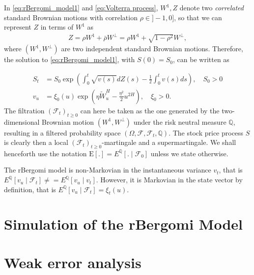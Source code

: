\documentclass[11pt]{article}
\newcommand{\expt}[1]{\mathrm{E}\left[#1\right]}
\newcommand{\PERIOD}{.}
\begin{document}
In \eqref{eq:rBergomi_model1} and \eqref{eq:Volterra process}, $W^1, Z$ denote two \emph{correlated} standard Brownian motions with correlation $\rho \in ]-1,0]$, so that we can represent $Z$ in terms of $W^1$ as
\begin{align*}
	Z=\rho	W^1+ \bar{\rho}W^\perp = \rho W^1+\sqrt{1-\rho^2} W^\perp,
\end{align*}
where $(W^1,W^\perp)$ are two independent standard Brownian motions.
Therefore, the solution to \eqref{eq:rBergomi_model1}, with $S(0)=S_0$, can be written as 

\begin{align}\label{eq:rBergomi_model}
	S_t&= S_0  \operatorname{exp}\left( \int_{0}^{t} \sqrt{v(s)} dZ(s)- \frac{1}{2} \int_{0}^{t} v(s) ds   \right),\quad S_0>0 \nonumber\\
	v_u&=\xi_0(u) \operatorname{exp}\left( \eta \widetilde{W}_u^H- \frac{\eta^2}{2} u^{2H} \right), \quad \xi_0>0 \PERIOD
\end{align}
The filtration $(\mathcal{F}_t)_{t\ge 0}$ can here be taken as the one generated by the two-dimensional Brownian motion $(W^1,W^\perp)$ under the risk neutral measure $\mathbb{Q}$, resulting in  a filtered probability space $(\Omega,\mathcal{F}, \mathcal{F}_t,\mathbb{Q})$. The stock price process $S$ is clearly then a local
$(\mathcal{F}_t)_{t\ge 0}$-martingale and a supermartingale.  We shall henceforth use the notation $\expt{.} = E^{\mathbb{Q}}\left[. \mid \mathcal{F}_0\right]$ unless we state otherwise.

\begin{remark}
The rBergomi model is non-Markovian in the instantaneous variance $v_t$, that is $E^{\mathbb{Q}}\left[v_u\mid \mathcal{F}_t\right] \neq= E^{\mathbb{Q}}\left[v_u\mid v_t\right]$. However, it is Markovian in the state vector by definition, that is $E^{\mathbb{Q}}\left[v_u\mid\mathcal{F}_t\right]=\xi_t(u)$.
\end{remark}




\section{Simulation of the rBergomi Model}\label{sec:Simulation of the rBergomi model}

 
 \section{Weak error analysis}\label{sec:Weak error analysis}
\end{document}
